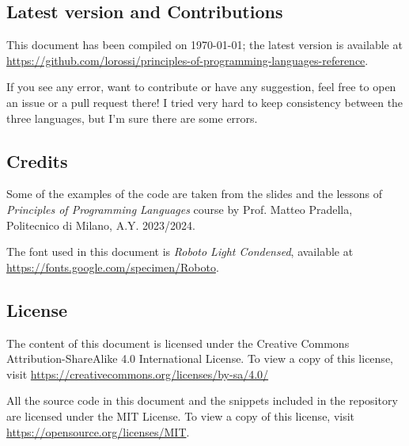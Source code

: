 \documentclass[a4paper,landscape,10pt]{article}
\begin{document}
\subsection{Latest version and Contributions}

This document has been compiled on \today;
the latest version is available at \url{https://github.com/lorossi/principles-of-programming-languages-reference}.

If you see any error, want to contribute or have any suggestion, feel free to open an issue or a pull request there!
I tried very hard to keep consistency between the three languages, but I'm sure there are some errors.

\bigskip

\subsection{Credits}

Some of the examples of the code are taken from the slides and the lessons of \textit{Principles of Programming Languages} course by Prof. Matteo Pradella, Politecnico di Milano, A.Y. 2023/2024.

The font used in this document is \textit{Roboto Light Condensed}, available at \url{https://fonts.google.com/specimen/Roboto}.

\bigskip

\subsection{License}

The content of this document is licensed under the Creative Commons Attribution-ShareAlike 4.0 International License. To view a copy of this license, visit \url{https://creativecommons.org/licenses/by-sa/4.0/}
\ccbysa

All the source code in this document and the snippets included in the repository are licensed under the MIT License. To view a copy of this license, visit \url{https://opensource.org/licenses/MIT}.
\end{document}

